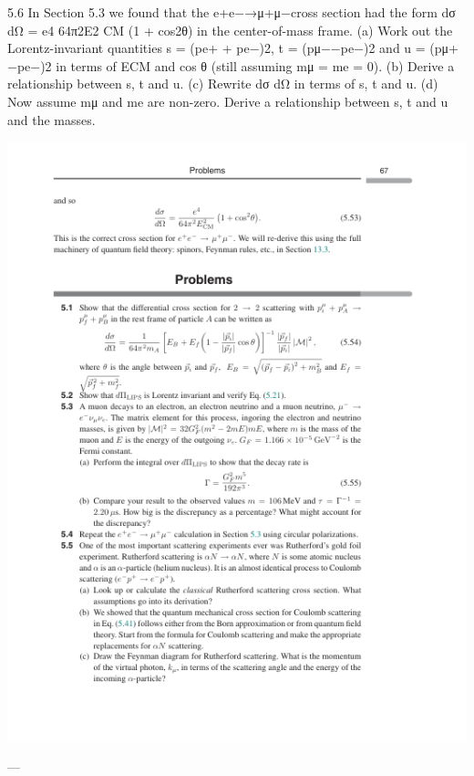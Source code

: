 5.6 In Section 5.3 we found that the e+e−→μ+μ−cross section had the form dσ
dΩ =
e4
64π2E2
CM (1 + cos2θ) in the center-of-mass frame.
(a) Work out the Lorentz-invariant quantities s = (pe+ + pe−)2, t = (pμ−−pe−)2
and
u = (pμ+ −pe−)2
in
terms
of
ECM
and
cos θ
(still
assuming
mμ = me = 0).
(b) Derive a relationship between s, t and u.
(c) Rewrite dσ
dΩ in terms of s, t and u.
(d) Now assume mμ and me are non-zero. Derive a relationship between s, t and
u and the masses.

\includegraphics{./figs/5_Cross_sections_and_decay_rates_page_87.png}

---


